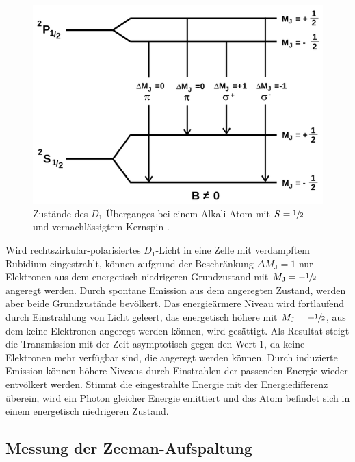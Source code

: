 \begin{figure}
  \centering
  \includegraphics[width=\textwidth]{img/uebergang.png}
  \caption{Zustände des $D_1$-Überganges bei einem Alkali-Atom mit $S=\sfrac{1}{2}$ und
  vernachlässigtem Kernspin \cite{FP}.}
  \label{uebergang}
\end{figure}

Wird rechtszirkular-polarisiertes $D_1$-Licht in eine Zelle mit verdampftem Rubidium eingestrahlt,
können aufgrund der Beschränkung $\Delta M_\text{J} = 1$ nur Elektronen aus dem energetisch
niedrigeren Grundzustand mit $M_\text{J}=-\sfrac{1}{2}$ angeregt werden. Durch spontane Emission
aus dem angeregten Zustand, werden aber beide Grundzustände bevölkert. Das energieärmere Niveau
wird fortlaufend durch Einstrahlung von Licht geleert, das energetisch höhere mit
$M_\text{J}=+\sfrac{1}{2}$, aus dem keine Elektronen angeregt werden können, wird gesättigt.
Als Resultat steigt die Transmission mit der Zeit asymptotisch gegen den Wert 1, da keine
Elektronen mehr verfügbar sind, die angeregt werden können. Durch induzierte Emission können
höhere Niveaus durch Einstrahlen der passenden Energie wieder entvölkert werden. Stimmt die
eingestrahlte Energie mit der Energiedifferenz überein, wird ein Photon gleicher Energie
emittiert und das Atom befindet sich in einem energetisch niedrigeren Zustand.

\subsection{Messung der Zeeman-Aufspaltung}


